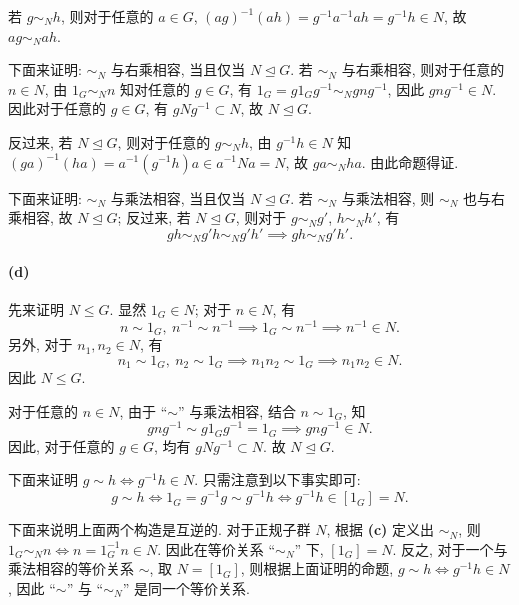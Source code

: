 \documentclass{article}
\begin{document}
\begin{solution}
	若 $g \sim_N h$, 则对于任意的 $a\in G$, $(ag)^{-1}(ah) = g^{-1}a^{-1}ah = g^{-1}h \in N$, 故 $ag \sim_N ah$.

	下面来证明: $\sim_N$ 与右乘相容, 当且仅当 $N \unlhd G$. 若 $\sim_N$ 与右乘相容, 则对于任意的 $n \in N$, 由 $1_G \sim_N n$ 知对任意的 $g \in G$, 有 $1_G = g1_Gg^{-1} \sim_N gng^{-1}$, 因此 $gng^{-1}\in N$. 因此对于任意的 $g \in G$, 有 $gNg^{-1} \subset N$, 故 $N \unlhd G$. 

	反过来, 若 $N \unlhd G$, 则对于任意的 $g \sim_N h$, 由 $g^{-1}h \in N$ 知 $(ga)^{-1}(ha) = a^{-1}(g^{-1}h)a \in a^{-1}Na = N$, 故 $ga \sim_N ha$. 由此命题得证. 

	下面来证明: $\sim_N$ 与乘法相容, 当且仅当 $N \unlhd G$. 若 $\sim_N$ 与乘法相容, 则 $\sim_N$ 也与右乘相容, 故 $N \unlhd G$; 反过来, 若 $N \unlhd G$, 则对于 $g \sim_N g'$, $h \sim_N h'$, 有
	\[ gh \sim_N g'h \sim_N g'h' \implies gh \sim_N g'h'. \]

	\paragraph{(d)} 先来证明 $N \le G$. 显然 $1_G \in N$; 对于 $n \in N$, 有
	\[ n \sim 1_G, \ n^{-1} \sim n^{-1} \implies 1_G \sim n^{-1} \implies n^{-1} \in N. \]
	另外, 对于 $n_1, n_2 \in N$, 有
	\[ n_1 \sim 1_G, \ n_2 \sim 1_G \implies n_1n_2 \sim 1_G \implies n_1n_2 \in N. \]
	因此 $N \le G$.

	对于任意的 $n \in N$, 由于 ``$\sim$'' 与乘法相容, 结合 $n \sim 1_G$, 知
	\[ gng^{-1} \sim g1_Gg^{-1} = 1_G \implies gng^{-1} \in N. \]
	因此, 对于任意的 $g \in G$, 均有 $gNg^{-1} \subset N$. 故 $N \unlhd G$. 

	下面来证明 $g \sim h \Leftrightarrow g^{-1}h \in N$. 只需注意到以下事实即可: 
	\[ g \sim h \Longleftrightarrow 1_G = g^{-1}g \sim g^{-1}h \Longleftrightarrow g^{-1}h \in [1_G] = N. \]

	下面来说明上面两个构造是互逆的. 对于正规子群 $N$, 根据 \textbf{(c)} 定义出 $\sim_N$, 则 $1_G \sim_N n \Longleftrightarrow n = 1_G^{-1}n \in N$. 因此在等价关系 ``$\sim_N$'' 下, $[1_G] = N$. 反之, 对于一个与乘法相容的等价关系 $\sim$, 取 $N = [1_G]$, 则根据上面证明的命题, $g \sim h \Longleftrightarrow g^{-1}h \in N$, 因此 ``$\sim$'' 与 ``$\sim_{N}$'' 是同一个等价关系. 
\end{solution}
\end{document}
